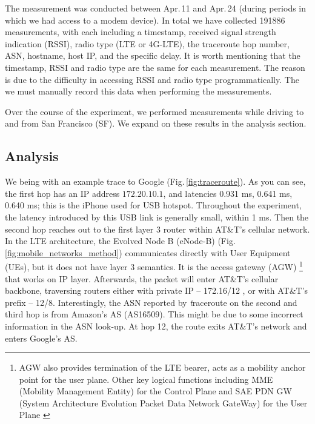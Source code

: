 The measurement was conducted between Apr.\,11 and Apr.\,24 (during periods in which we had access to a modem device). In total we have collected 191886 measurements, with each including a timestamp, received signal strength indication (RSSI), radio type (LTE or 4G-LTE), the traceroute hop number, ASN, hostname, host IP, and the specific delay. It is worth mentioning that the timestamp, RSSI and radio type are the same for each measurement. The reason is due to the difficulty in accessing RSSI and radio type programmatically. The we must manually record this data when performing the measurements.

Over the course of the experiment, we performed measurements while driving to and from San Francisco (SF). We expand on these results in the analysis section. 

\subsection{Analysis}
\label{sec:analysis}

We being with an example trace to Google (Fig.\,\ref{fig:traceroute}). As you can see, the first hop has an IP address $172.20.10.1$, and latencies 0.931 ms, 0.641 ms, 0.640 ms; this is the iPhone used for USB hotspot. Throughout the experiment, the latency introduced by this USB link is generally small, within 1 ms. Then the second hop reaches out to the first layer 3 router within AT\&T's cellular network. In the LTE architecture, the Evolved Node B (eNode-B) (Fig.\,\ref{fig:mobile_networks_method}) communicates directly with User Equipment (UEs), but it does not have layer 3 semantics. It is the access gateway (AGW) \footnote{AGW also provides termination of the LTE bearer, acts as a mobility anchor point for the user plane. Other key logical functions including MME (Mobility Management Entity) for the Control Plane and SAE PDN GW (System Architecture Evolution Packet Data Network GateWay) for the User Plane \cite{nortel}} that works on IP layer. Afterwards, the packet will enter AT\&T's cellular backbone, traversing routers either with private IP -- 172.16/12 \cite{rekhterrfc}, or with AT\&T's prefix -- 12/8. Interestingly, the ASN reported by {\textit traceroute} on the second and third hop is from Amazon's AS (AS16509). This might be due to some incorrect information in the ASN look-up. At hop 12, the route exits AT\&T's network and enters Google's AS.

